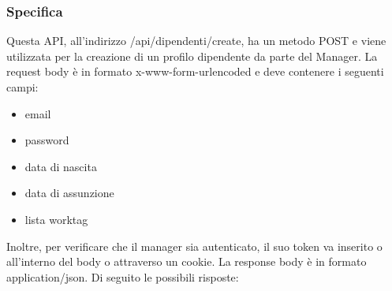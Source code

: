 \documentclass{report}
\begin{document}
		\subsubsection*{Specifica}
		Questa API, all'indirizzo /api/dipendenti/create, ha un metodo POST e viene utilizzata per la creazione di un profilo dipendente da parte del Manager.
		La request body è in formato x-www-form-urlencoded e deve contenere i seguenti campi:
		\begin{itemize}
			
			\item email
			\item password
			\item data di nascita
			\item data di assunzione
			\item lista worktag
		\end{itemize}
		Inoltre, per verificare che il manager sia autenticato, il suo token va inserito o all'interno del body o attraverso un cookie.
		La response body è in formato application/json. Di seguito le possibili risposte:
\end{document}
